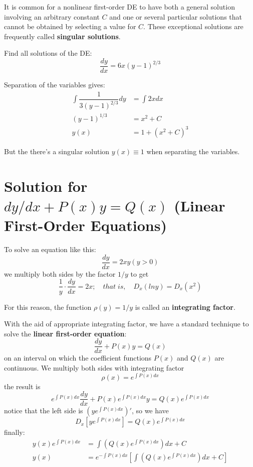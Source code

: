 \begin{definition}
    It is common for a nonlinear first-order DE to have both a general solution involving an arbitrary constant \(C\) and one or several particular solutions that cannot be obtained by selecting a value for \(C\).  
    These exceptional solutions are frequently called \textbf{singular solutions}. 
\end{definition}

\begin{example}
    Find all solutions of the DE:
    \[
        \dfrac{dy}{dx} = 6x(y-1)^{2/3}
    \]

    Separation of the variables gives:
    \begin{align*}
        \int \dfrac{1}{3(y-1)^{2/3}} dy &= \int 2x dx \\
        (y-1)^{1/3} &= x^2 +C \\
        y(x) &= 1 + (x^2 + C)^3 \tag{general solutions}
    \end{align*}

    But the there's a singular solution \(y(x) \equiv 1\) when separating the variables. 
\end{example}

\section{Solution for \({dy}/{dx} + P(x) y = Q(x)\) (Linear First-Order Equations)}

\begin{example}
    To solve an equation like this:
    \[
        \dfrac{dy}{dx} = 2xy (y > 0)
    \]
    we multiply both sides by the factor \(1/y\) to get
    \[
        \dfrac{1}{y} \cdot \dfrac{dy}{dx} = 2x; 
        \quad
        that\;is,
        \quad 
        D_x(ln y) = D_x(x^2)
    \]  

    For this reason, the function \(\rho(y) = 1/y\) is called an \textbf{integrating factor}.
\end{example}

With the aid of appropriate integrating factor, we have a standard technique to solve the \textbf{linear first-order equation}:
\[
    \dfrac{dy}{dx} + P(x) y = Q(x) 
\]
on an interval on which the coefficient functions \(P(x)\) and \(Q(x)\) are continuous.   
We multiply both sides with integrating factor 
\[
    \rho(x) =  e^{\int P(x)dx}    
\]
the result is
\[
    e^{\int P(x)dx} \dfrac{dy}{dx} + P(x) e^{\int P(x)dx} y = Q(x) e^{\int P(x)dx}
\]
notice that the left side is \((y e^{\int P(x)dx})'\), so we have
\[
    D_x[y e^{\int P(x)dx}] = Q(x) e^{\int P(x) dx} 
\] 
finally:
\begin{align*}
    y(x) e^{\int P(x)dx} &= \int (Q(x) e^{\int P(x) dx})dx + C\\
    y(x)  &= e^{-\int P(x)dx}[\int (Q(x) e^{\int P(x) dx})dx + C]
\end{align*}


